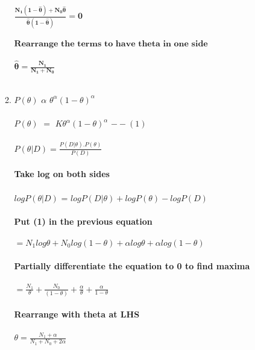 \documentclass[12pt,a4paper]{article}
\begin{document}
\begin{enumerate}
\begin{enumerate}
  $\mathbf{\frac{N_1(1-\widehat{\theta})+N_0\widehat{\theta}}{\widehat{\theta}(1-\widehat{\theta})} = 0 }$ \\ \\
 $\textbf{Rearrange the terms to have theta in one side}$ \\ \\
 $ \mathbf{\widehat{\theta} = \frac{N_1}{N_1+N_0}}$ \\ \\
 
    \item 
    $ P(\theta)$ $\alpha$  $\theta^{\alpha}(1-\theta)^{\alpha}$ \\ \\
    $ P(\theta)$ $=$  $K\theta^{\alpha}(1-\theta)^{\alpha}$         $--(1)$ \\ \\
    $P(\theta|D) = \frac{P(D|\theta).P(\theta)}{P(D)}$ \\ \\
    \textbf{Take log on both sides} \\ \\
    $log P(\theta|D) $ = $log P(D|\theta) + log P(\theta) - log P(D)$ \\ \\
    \textbf{Put (1) in the previous equation} \\ \\
                      $ = N_1 log \theta + N_0 log (1-\theta) + \alpha log \theta + \alpha log (1-\theta)$ \\ \\
     \textbf{Partially differentiate the equation to 0 to find maxima}
     \\                   \\  
    $= \frac{N_1}{\theta} + \frac{N_0}{(1-\theta)} + \frac{\alpha}{\theta} + \frac{\alpha}{1-\theta}$    \\ \\
    \textbf{Rearrange with theta at LHS} \\ \\
    $\theta = \frac{N_1+\alpha}{N_1+N_0+2\alpha}$
    
 
 
	\end{enumerate}
\end{enumerate}
    
\end{document}
